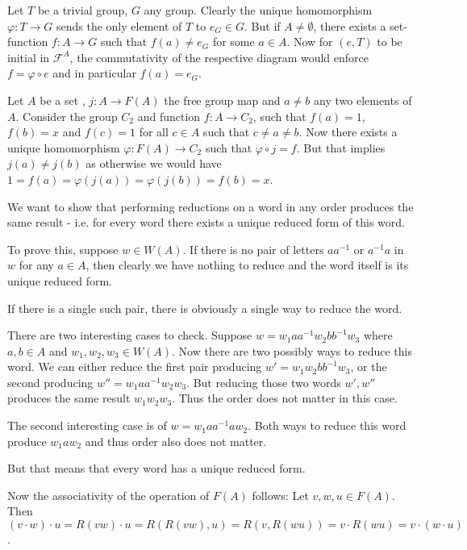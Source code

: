 \begin{solution}
	Let $T$ be a trivial group, $G$ any group. Clearly the unique homomorphism $\varphi: T \to G$ sends the only element of $T$ to $e_G \in G$. But if $A \neq \emptyset$, there exists a set-function $f: A \to G$ such that $f(a) \neq e_G$ for some $a \in A$. Now for $(e, T)$ to be initial in $\mathscr{F}^A$, the commutativity of the respective diagram would enforce $f = \varphi \circ e$ and in particular $f(a) = e_G$.
\end{solution}

\begin{problem}
\end{problem}

\begin{solution}
	Let $A$ be a set , $j: A \to F(A)$ the free group map and $a \neq b$ any two elements of $A$. Consider the group $C_2$ and function $f: A \to C_2$, such that $f(a) = 1$, $f(b) = x$ and $f(c) = 1$ for all $c \in A$ such that $c \neq a \neq b$. Now there exists a unique homomorphism $\varphi: F(A) \to C_2$ such that $\varphi \circ j = f$. But that implies $j(a) \neq j(b)$ as otherwise we would have $1 = f(a) = \varphi(j(a)) = \varphi(j(b)) = f(b) = x$.
\end{solution}

\begin{problem}
\end{problem}

\begin{solution}
	We want to show that performing reductions on a word in any order produces the same result - i.e. for every word there exists a unique reduced form of this word.
	
	To prove this, suppose $w \in W(A)$. If there is no pair of letters $aa^{-1}$ or $a^{-1}a$ in $w$ for any $a \in A$, then clearly we have nothing to reduce and the word itself is its unique reduced form.
	
	If there is a single such pair, there is obviously a single way to reduce the word.
	
	There are two interesting cases to check. Suppose $w = w_1 a a^{-1} w_2 b b^{-1} w_3$ where $a, b \in A$ and $w_1, w_2, w_3 \in W(A)$. Now there are two possibly ways to reduce this word. We can either reduce the first pair producing $w' = w_1 w_2 b b^{-1} w_3$, or the second producing $w'' = w_1 a a^{-1} w_2 w_3$. But reducing those two words $w', w''$ produces the same result $w_1 w_2 w_3$. Thus the order does not matter in this case.
	
	The second interesting case is of $w = w_1 a a^{-1} a w_2$. Both ways to reduce this word produce $w_1 a w_2$ and thus order also does not matter.
	
	But that means that every word has a unique reduced form.
	
	Now the associativity of the operation of $F(A)$ follows: Let $v, w, u \in F(A)$. Then $(v \cdot w) \cdot u = R(vw) \cdot u = R(R(vw), u) = R(v, R(wu)) = v \cdot R(wu) = v \cdot (w \cdot u)$.
\end{solution}

